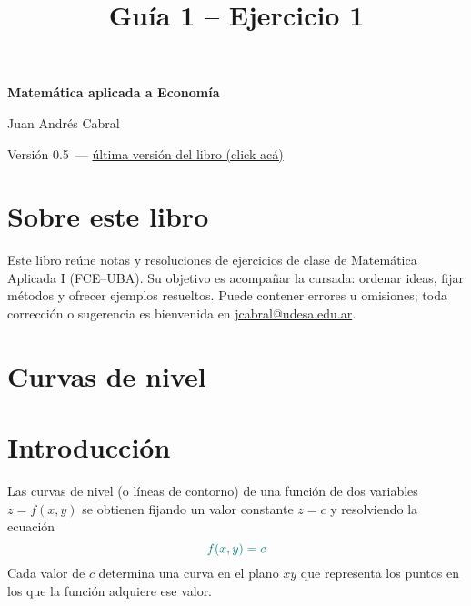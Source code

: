 \documentclass{article}
\newcommand{\version}{0.5}
\begin{document}
\begin{titlepage}
    \centering
    \vspace*{2cm}
    {\Huge\bfseries\color{teal} Matemática aplicada a Economía\par}
    \vspace{0.5cm}
    {\Large\bfseries \par}
    \vspace{2cm}
    {\large Juan Andrés Cabral\par}
    \vfill
{\normalsize Versión \version\ — \href{https://cabraljuan.github.io/matematica%20aplicada/matematica%20aplicada%201.pdf}{última versión del libro (click acá)}\par}
    \thispagestyle{empty}
\end{titlepage}

\section*{Sobre este libro}

Este libro reúne notas y resoluciones de ejercicios de clase de Matemática Aplicada I (FCE–UBA). Su objetivo es acompañar la cursada: ordenar ideas, fijar métodos y ofrecer ejemplos resueltos. Puede contener errores u omisiones; toda corrección o sugerencia es bienvenida en \url{jcabral@udesa.edu.ar}.
\newpage


\renewcommand{\contentsname}{Índice}
\tableofcontents
\newpage

\title{Guía 1 – Ejercicio 1}
\author{}
\date{}





\section{Curvas de nivel}

\section*{Introducción}
Las curvas de nivel (o líneas de contorno) de una función de dos variables \(z=f(x,y)\) se obtienen fijando un valor constante \(z=c\) y resolviendo la ecuación
\[
\color{teal} f(x,y)=c
\]
Cada valor de \(c\) determina una curva en el plano \(xy\) que representa los puntos en los que la función adquiere ese valor.
\end{document}
